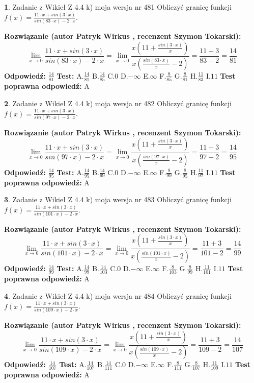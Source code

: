 \documentclass[12pt, a4paper]{article}
\theoremstyle{definition} %
\newtheorem{zad}{}
\newcommand{\zadStart}[1]{\begin{zad}#1\newline}
\newcommand{\zadStop}{\end{zad}}
\newcommand{\rozwStart}[2]{\noindent \textbf{Rozwiązanie (autor #1 , recenzent #2): }\newline}
\newcommand{\rozwStop}{\newline}
\newcommand{\odpStart}{\noindent \textbf{Odpowiedź:}\newline}
\newcommand{\odpStop}{\newline}
\newcommand{\testStart}{\noindent \textbf{Test:}\newline}
\newcommand{\testStop}{\newline}
\newcommand{\kluczStart}{\noindent \textbf{Test poprawna odpowiedź:}\newline}
\newcommand{\kluczStop}{\newline}
\begin{document}
\zadStart{Zadanie z Wikieł Z 4.4 k) moja wersja nr 481}
Obliczyć granicę funkcji $f(x)=\frac{11\cdot x +sin(3\cdot x)}{sin(83\cdot x) -2\cdot x}$.
\zadStop
\rozwStart{Patryk Wirkus}{Szymon Tokarski}
$$\lim\limits_{x\to 0}\frac{11\cdot x +sin(3\cdot x)}{sin(83\cdot x) -2\cdot x}
=\lim\limits_{x\to 0}\frac{x(11+\frac{sin(3\cdot x)}{x})}{x(\frac{sin(83\cdot x)}{x}-2)}
=\frac{11+3}{83-2} = \frac{14}{81}$$
\rozwStop
\odpStart
$\frac{14}{81}$
\odpStop
\testStart
A.$\frac{14}{81}$
B.$\frac{14}{85}$
C.$0$
D.$-\infty$
E.$\infty$
F.$\frac{8}{85}$
G.$\frac{8}{81}$
H.$\frac{11}{83}$
I.$11$
\testStop
\kluczStart
A
\kluczStop



\zadStart{Zadanie z Wikieł Z 4.4 k) moja wersja nr 482}
Obliczyć granicę funkcji $f(x)=\frac{11\cdot x +sin(3\cdot x)}{sin(97\cdot x) -2\cdot x}$.
\zadStop
\rozwStart{Patryk Wirkus}{Szymon Tokarski}
$$\lim\limits_{x\to 0}\frac{11\cdot x +sin(3\cdot x)}{sin(97\cdot x) -2\cdot x}
=\lim\limits_{x\to 0}\frac{x(11+\frac{sin(3\cdot x)}{x})}{x(\frac{sin(97\cdot x)}{x}-2)}
=\frac{11+3}{97-2} = \frac{14}{95}$$
\rozwStop
\odpStart
$\frac{14}{95}$
\odpStop
\testStart
A.$\frac{14}{95}$
B.$\frac{14}{99}$
C.$0$
D.$-\infty$
E.$\infty$
F.$\frac{8}{99}$
G.$\frac{8}{95}$
H.$\frac{11}{97}$
I.$11$
\testStop
\kluczStart
A
\kluczStop



\zadStart{Zadanie z Wikieł Z 4.4 k) moja wersja nr 483}
Obliczyć granicę funkcji $f(x)=\frac{11\cdot x +sin(3\cdot x)}{sin(101\cdot x) -2\cdot x}$.
\zadStop
\rozwStart{Patryk Wirkus}{Szymon Tokarski}
$$\lim\limits_{x\to 0}\frac{11\cdot x +sin(3\cdot x)}{sin(101\cdot x) -2\cdot x}
=\lim\limits_{x\to 0}\frac{x(11+\frac{sin(3\cdot x)}{x})}{x(\frac{sin(101\cdot x)}{x}-2)}
=\frac{11+3}{101-2} = \frac{14}{99}$$
\rozwStop
\odpStart
$\frac{14}{99}$
\odpStop
\testStart
A.$\frac{14}{99}$
B.$\frac{14}{103}$
C.$0$
D.$-\infty$
E.$\infty$
F.$\frac{8}{103}$
G.$\frac{8}{99}$
H.$\frac{11}{101}$
I.$11$
\testStop
\kluczStart
A
\kluczStop



\zadStart{Zadanie z Wikieł Z 4.4 k) moja wersja nr 484}
Obliczyć granicę funkcji $f(x)=\frac{11\cdot x +sin(3\cdot x)}{sin(109\cdot x) -2\cdot x}$.
\zadStop
\rozwStart{Patryk Wirkus}{Szymon Tokarski}
$$\lim\limits_{x\to 0}\frac{11\cdot x +sin(3\cdot x)}{sin(109\cdot x) -2\cdot x}
=\lim\limits_{x\to 0}\frac{x(11+\frac{sin(3\cdot x)}{x})}{x(\frac{sin(109\cdot x)}{x}-2)}
=\frac{11+3}{109-2} = \frac{14}{107}$$
\rozwStop
\odpStart
$\frac{14}{107}$
\odpStop
\testStart
A.$\frac{14}{107}$
B.$\frac{14}{111}$
C.$0$
D.$-\infty$
E.$\infty$
F.$\frac{8}{111}$
G.$\frac{8}{107}$
H.$\frac{11}{109}$
I.$11$
\testStop
\kluczStart
A
\kluczStop
\end{document}
